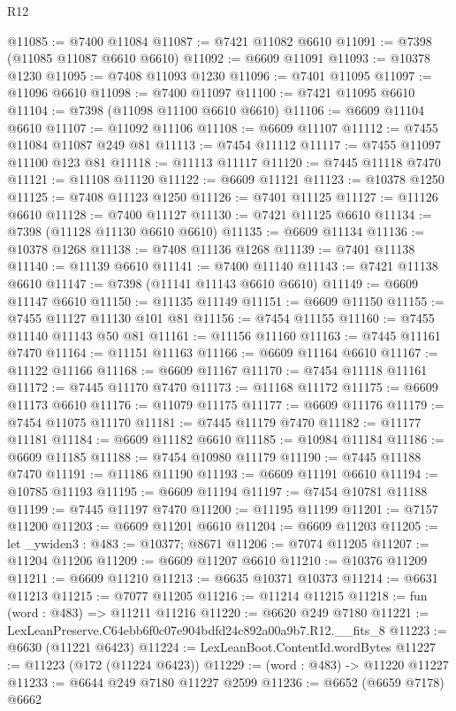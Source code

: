 \begin{lexlean}{R12}
\begin{coremodule}
@11085 := @7400 @11084
@11087 := @7421 @11082 @6610
@11091 := @7398 (@11085 @11087 @6610 @6610)
@11092 := @6609 @11091
@11093 := @10378 @1230
@11095 := @7408 @11093 @1230
@11096 := @7401 @11095
@11097 := @11096 @6610
@11098 := @7400 @11097
@11100 := @7421 @11095 @6610
@11104 := @7398 (@11098 @11100 @6610 @6610)
@11106 := @6609 @11104 @6610
@11107 := @11092 @11106
@11108 := @6609 @11107
@11112 := @7455 @11084 @11087 @249 @81
@11113 := @7454 @11112
@11117 := @7455 @11097 @11100 @123 @81
@11118 := @11113 @11117
@11120 := @7445 @11118 @7470
@11121 := @11108 @11120
@11122 := @6609 @11121
@11123 := @10378 @1250
@11125 := @7408 @11123 @1250
@11126 := @7401 @11125
@11127 := @11126 @6610
@11128 := @7400 @11127
@11130 := @7421 @11125 @6610
@11134 := @7398 (@11128 @11130 @6610 @6610)
@11135 := @6609 @11134
@11136 := @10378 @1268
@11138 := @7408 @11136 @1268
@11139 := @7401 @11138
@11140 := @11139 @6610
@11141 := @7400 @11140
@11143 := @7421 @11138 @6610
@11147 := @7398 (@11141 @11143 @6610 @6610)
@11149 := @6609 @11147 @6610
@11150 := @11135 @11149
@11151 := @6609 @11150
@11155 := @7455 @11127 @11130 @101 @81
@11156 := @7454 @11155
@11160 := @7455 @11140 @11143 @50 @81
@11161 := @11156 @11160
@11163 := @7445 @11161 @7470
@11164 := @11151 @11163
@11166 := @6609 @11164 @6610
@11167 := @11122 @11166
@11168 := @6609 @11167
@11170 := @7454 @11118 @11161
@11172 := @7445 @11170 @7470
@11173 := @11168 @11172
@11175 := @6609 @11173 @6610
@11176 := @11079 @11175
@11177 := @6609 @11176
@11179 := @7454 @11075 @11170
@11181 := @7445 @11179 @7470
@11182 := @11177 @11181
@11184 := @6609 @11182 @6610
@11185 := @10984 @11184
@11186 := @6609 @11185
@11188 := @7454 @10980 @11179
@11190 := @7445 @11188 @7470
@11191 := @11186 @11190
@11193 := @6609 @11191 @6610
@11194 := @10785 @11193
@11195 := @6609 @11194
@11197 := @7454 @10781 @11188
@11199 := @7445 @11197 @7470
@11200 := @11195 @11199
@11201 := @7157 @11200
@11203 := @6609 @11201 @6610
@11204 := @6609 @11203
@11205 := let _ywiden3 : @483 := @10377; @8671
@11206 := @7074 @11205
@11207 := @11204 @11206
@11209 := @6609 @11207 @6610
@11210 := @10376 @11209
@11211 := @6609 @11210
@11213 := @6635 @10371 @10373
@11214 := @6631 @11213
@11215 := @7077 @11205
@11216 := @11214 @11215
@11218 := fun (word : @483) => @11211 @11216
@11220 := @6620 @249 @7180
@11221 := LexLeanPreserve.C64ebb6f0c07e904bdfd24c892a00a9b7.R12.__fits_8
@11223 := @6630 (@11221 @6423)
@11224 := LexLeanBoot.ContentId.wordBytes
@11227 := @11223 (@172 (@11224 @6423))
@11229 := (word : @483) -> @11220 @11227
@11233 := @6644 @249 @7180 @11227 @2599
@11236 := @6652 (@6659 @7178) @6662

\end{coremodule}
\end{lexlean}
